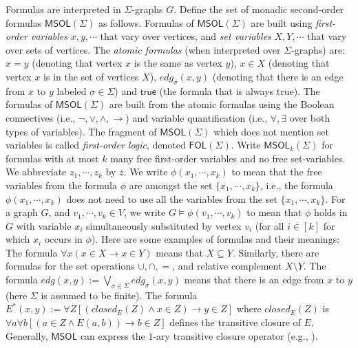 \documentclass{llncs}
\newcommand{\head}[1]{\vspace{2mm} \noindent  {\bf #1}}
\def\MRTL{\textsf{MRTL}}
\newcommand{\tup}[1]{\overline{#1}}
\def\deg{\textsf{deg}}
\def\true{\textsf{true}}
\def\fol{\mathsf{FOL}}
\def\msol{\mathsf{MSOL}}
\begin{document}

\head{Monadic Second-order Logic.} \label{dfn:msol} Formulas are interpreted in $\Sigma$-graphs $G$. Define the set of monadic second-order formulas $\msol(\Sigma)$ as follows. Formulas of $\msol(\Sigma)$ are built using {\em first-order variables} $x,y,\cdots$ that vary over vertices, and {\em set variables} $X,Y, \cdots$ that vary over sets of vertices. The {\em atomic formulas} (when interpreted over $\Sigma$-graphs) are: $x = y$ (denoting that vertex $x$ is the same as vertex $y$), $x \in X$ (denoting that vertex $x$ is in the set of vertices $X$), $edg_\sigma(x,y)$ (denoting that there is an edge from $x$ to $y$ labeled $\sigma \in \Sigma$) and $\true$ (the formula that is always true). The formulas of $\msol(\Sigma)$ are built from the atomic  formulas using the Boolean connectives (i.e., $\neg,\vee, \wedge, \to$) and variable quantification (i.e., $\forall,\exists$ over both types of variables). The fragment of $\msol(\Sigma)$ which does not mention set variables is called {\em first-order logic}, denoted $\fol(\Sigma)$.
Write $\msol_k(\Sigma)$ for formulas with at most $k$ many free first-order variables and no free set-variables. We abbreviate $z_1, \cdots, z_k$ by $\tup{z}$. We write $\phi(x_1, \cdots, x_k)$ to mean that the free variables from the formula $\phi$ are amongst the set $\{x_1, \cdots, x_k\}$, i.e., the formula $\phi(x_1,\cdots,x_k)$ does not need to use all the variables from the set $\{x_1,\cdots,x_k\}$. For a graph $G$, and $v_1,\cdots,v_k \in V$, we write $G \models \phi(v_1,\cdots,v_k)$ to mean that $\phi$ holds in $G$ with variable $x_i$ simultaneously substituted by vertex $v_i$ (for all $i \in [k]$ for which $x_i$ occurs in $\phi$).
%
Here are some examples of formulas and their meanings:\label{ex:formulas}
 The formula $\forall x (x \in X \to x \in Y)$ means that $X \subseteq Y$. Similarly, there are formulas for the set operations $\cup, \cap,=$, and relative complement $X \setminus Y$.
 The formula $edg(x,y) := \bigvee_{\sigma \in \Sigma} edg_\sigma(x,y)$ means that there is an edge from $x$ to $y$ (here $\Sigma$ is assumed to be finite).
%
 The formula $E^*(x,y) := \forall Z [(closed_{E}(Z) \wedge x \in Z) \to y \in Z]$ where $closed_{E}(Z)$ is  $\forall a \forall b[(a \in Z \wedge E(a,b)) \to b \in Z]$ defines the transitive closure of $E$. Generally, $\msol$ can express the $1$-ary transitive closure operator (e.g., \cite{Rubin15AAMAS}).
\end{document}
